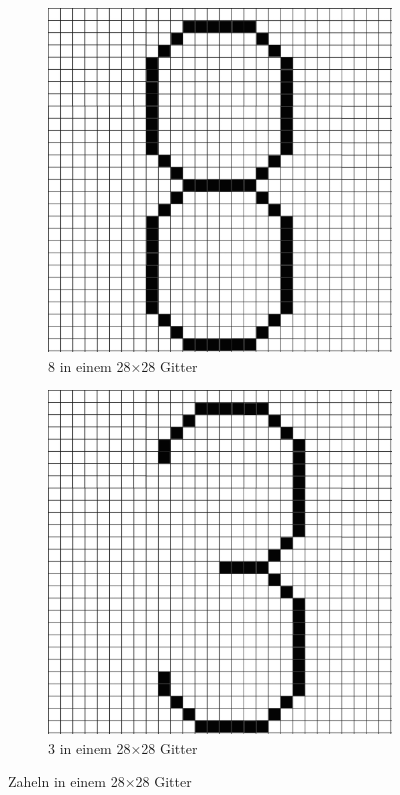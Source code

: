 \begin{figure}[H]
    \begin{subfigure}{.5\textwidth}
        \centering
        \includegraphics[width=.8\linewidth]{images/practice/numbers/8_in_28x28_grid.jpg}
        \caption{8 in einem 28×28 Gitter}
        \label{fig:8_in_28x28_grid}
    \end{subfigure}%
    \begin{subfigure}{.5\textwidth}
        \centering
        \includegraphics[width=.8\linewidth]{images/practice/numbers/3_in_28x28_grid.jpg}
        \caption{3 in einem 28×28 Gitter}
        \label{fig:3_in_28x28_grid}
    \end{subfigure}
    \caption{Zaheln in einem 28×28 Gitter}
    \label{fig:28x28_grid}
\end{figure}


